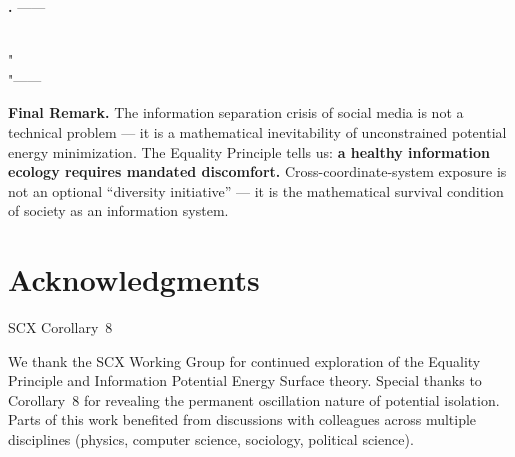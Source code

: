 \documentclass[11pt,a4paper]{article}
\theoremstyle{remark}
\begin{document}
\medskip
\noindent\textbf{.}
——

\textbf{}
\\"\\"——


\textbf{Final Remark.}
The information separation crisis of social media is not a technical problem ---
it is a mathematical inevitability of unconstrained potential energy minimization.
The Equality Principle tells us: \textbf{a healthy information ecology requires
mandated discomfort.} Cross-coordinate-system exposure is not an optional
``diversity initiative'' --- it is the mathematical survival condition of
society as an information system.

\section*{ Acknowledgments}

SCX
Corollary~8



We thank the SCX Working Group for continued exploration of the Equality Principle and
Information Potential Energy Surface theory. Special thanks to Corollary~8 for
revealing the permanent oscillation nature of potential isolation. Parts of this work
benefited from discussions with colleagues across multiple disciplines (physics,
computer science, sociology, political science).
\end{document}
